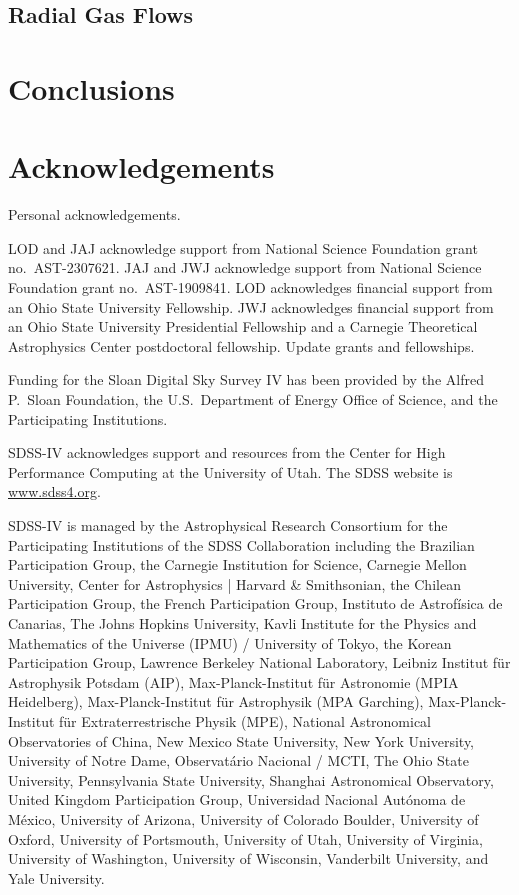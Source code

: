 \documentclass[twocolumn,twocolappendix,linenumbers]{aastex631}
\newcommand{\todo}[1]{{\color{red}#1}}
\begin{document}
\subsection{Radial Gas Flows}
\label{sec:radial-flows}

\section{Conclusions}
\label{sec:conclusions}

\section*{Acknowledgements}

\todo{Personal acknowledgements.}

LOD and JAJ acknowledge support from National Science Foundation grant no.\ AST-2307621. JAJ and JWJ acknowledge support from National Science Foundation grant no.\ AST-1909841.
LOD acknowledges financial support from an Ohio State University Fellowship.
JWJ acknowledges financial support from an Ohio State University Presidential Fellowship and a Carnegie Theoretical Astrophysics Center postdoctoral fellowship. \todo{Update grants and fellowships.}

Funding for the Sloan Digital Sky 
Survey IV has been provided by the 
Alfred P.\ Sloan Foundation, the U.S.\ 
Department of Energy Office of 
Science, and the Participating 
Institutions. 

SDSS-IV acknowledges support and 
resources from the Center for High 
Performance Computing  at the 
University of Utah. The SDSS 
website is \url{www.sdss4.org}.

SDSS-IV is managed by the 
Astrophysical Research Consortium 
for the Participating Institutions 
of the SDSS Collaboration including 
the Brazilian Participation Group, 
the Carnegie Institution for Science, 
Carnegie Mellon University, Center for 
Astrophysics | Harvard \& 
Smithsonian, the Chilean Participation 
Group, the French Participation Group, 
Instituto de Astrof\'isica de 
Canarias, The Johns Hopkins 
University, Kavli Institute for the 
Physics and Mathematics of the 
Universe (IPMU) / University of 
Tokyo, the Korean Participation Group, 
Lawrence Berkeley National Laboratory, 
Leibniz Institut f\"ur Astrophysik 
Potsdam (AIP),  Max-Planck-Institut 
f\"ur Astronomie (MPIA Heidelberg), 
Max-Planck-Institut f\"ur 
Astrophysik (MPA Garching), 
Max-Planck-Institut f\"ur 
Extraterrestrische Physik (MPE), 
National Astronomical Observatories of 
China, New Mexico State University, 
New York University, University of 
Notre Dame, Observat\'ario 
Nacional / MCTI, The Ohio State 
University, Pennsylvania State 
University, Shanghai 
Astronomical Observatory, United 
Kingdom Participation Group, 
Universidad Nacional Aut\'onoma 
de M\'exico, University of Arizona, 
University of Colorado Boulder, 
University of Oxford, University of 
Portsmouth, University of Utah, 
University of Virginia, University 
of Washington, University of 
Wisconsin, Vanderbilt University, 
and Yale University.
\end{document}
